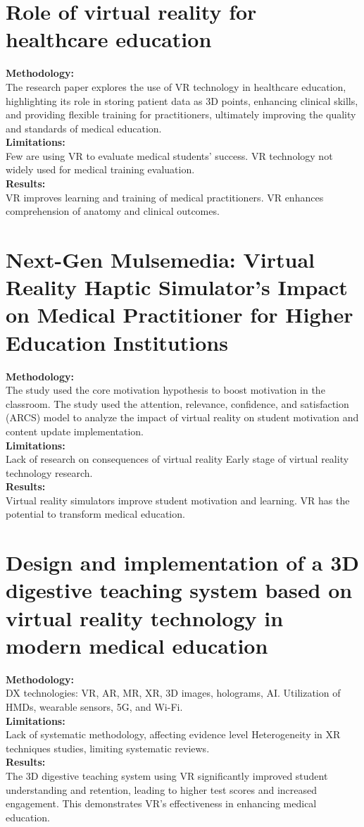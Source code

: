 \section{Role of virtual reality for healthcare education
	\cite{BookChapter}}
\textbf{Methodology:}\\The research paper explores the use of VR technology in healthcare education, highlighting its role in storing patient data as 3D points, enhancing clinical skills, and providing flexible training for practitioners, ultimately improving the quality and standards of medical education.\\
\textbf{Limitations:}\\
Few are using VR to evaluate medical students' success. VR technology not widely used for medical training evaluation.\\
\textbf{Results:}\\ VR improves learning and training of medical practitioners.
VR enhances comprehension of anatomy and clinical outcomes.
\section{Next-Gen Mulsemedia: Virtual Reality Haptic Simulator’s Impact on Medical Practitioner for Higher Education Institutions
	\cite{journalarticle4}\cite{JournalArticle5}\cite{JournalArticle8}}
\textbf{Methodology:}\\ The study used the core motivation hypothesis to boost motivation in the classroom. The study used the attention, relevance, confidence, and satisfaction (ARCS) model to analyze the impact of virtual reality on student motivation and content update implementation.\\
\textbf{Limitations:}\\ Lack of research on consequences of virtual reality
Early stage of virtual reality technology research.\\
\textbf{Results:}\\ Virtual reality simulators improve student motivation and learning. VR has the potential to transform medical education.

\section{Design and implementation of a 3D digestive teaching system based on virtual reality technology in modern medical education
	\cite{Journal1}}
\textbf{Methodology:}\\
DX technologies: VR, AR, MR, XR, 3D images, holograms, AI. Utilization of HMDs, wearable sensors, 5G, and Wi-Fi.\\
\textbf{Limitations:}\\ Lack of systematic methodology, affecting evidence level
Heterogeneity in XR techniques studies, limiting systematic reviews.\\
\textbf{Results:}\\ The 3D digestive teaching system using VR significantly improved student understanding and retention, leading to higher test scores and increased engagement. This demonstrates VR's effectiveness in enhancing medical education.

